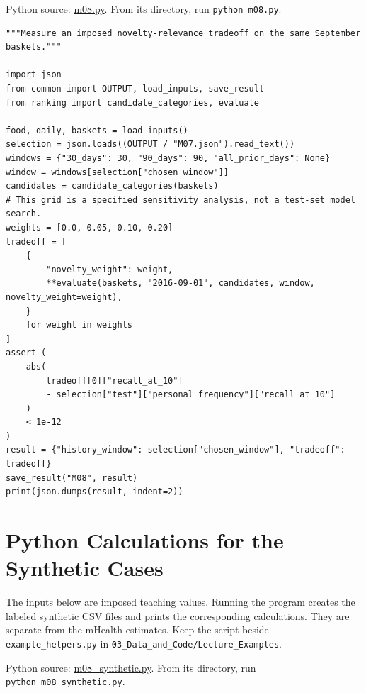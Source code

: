 \FloatBarrier
{}
Python source:
\href{../03_Data_and_Code/mHealth/recurring_examples/m08.py}{m08.py}.
From its directory, run \texttt{python\ m08.py}.

\begin{Verbatim}[breaklines,breakanywhere,fontsize=\small]
"""Measure an imposed novelty-relevance tradeoff on the same September baskets."""

import json
from common import OUTPUT, load_inputs, save_result
from ranking import candidate_categories, evaluate

food, daily, baskets = load_inputs()
selection = json.loads((OUTPUT / "M07.json").read_text())
windows = {"30_days": 30, "90_days": 90, "all_prior_days": None}
window = windows[selection["chosen_window"]]
candidates = candidate_categories(baskets)
# This grid is a specified sensitivity analysis, not a test-set model search.
weights = [0.0, 0.05, 0.10, 0.20]
tradeoff = [
    {
        "novelty_weight": weight,
        **evaluate(baskets, "2016-09-01", candidates, window, novelty_weight=weight),
    }
    for weight in weights
]
assert (
    abs(
        tradeoff[0]["recall_at_10"]
        - selection["test"]["personal_frequency"]["recall_at_10"]
    )
    < 1e-12
)
result = {"history_window": selection["chosen_window"], "tradeoff": tradeoff}
save_result("M08", result)
print(json.dumps(result, indent=2))
\end{Verbatim}

\hypertarget{M08-python-calculations-for-the-synthetic-cases}{%
\section{Python Calculations for the Synthetic
Cases}\label{M08-python-calculations-for-the-synthetic-cases}}

\noindent The inputs below are imposed teaching values. Running the program
creates the labeled synthetic CSV files and prints the corresponding
calculations. They are separate from the mHealth estimates. Keep the
script beside \texttt{example\_helpers.py} in
\texttt{03\_Data\_and\_Code/Lecture\_Examples}.

\FloatBarrier
{}
Python source:
\href{../03_Data_and_Code/Lecture_Examples/m08_synthetic.py}{m08\_synthetic.py}.
From its directory, run \texttt{python\ m08\_synthetic.py}.

